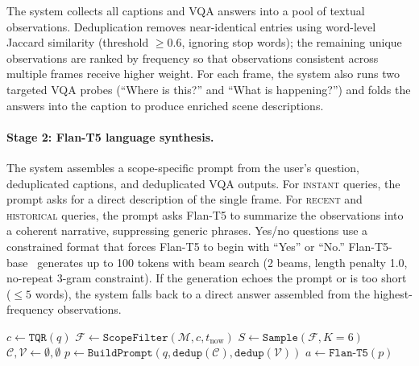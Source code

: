 The system collects all captions and VQA answers into a pool of textual observations.
Deduplication removes near-identical entries using word-level Jaccard similarity (threshold $\ge 0.6$, ignoring stop words); the remaining unique observations are ranked by frequency so that observations consistent across multiple frames receive higher weight.
For each frame, the system also runs two targeted VQA probes (``Where is this?'' and ``What is happening?'') and folds the answers into the caption to produce enriched scene descriptions.

\paragraph{Stage 2: Flan-T5 language synthesis.}
The system assembles a scope-specific prompt from the user's question, deduplicated captions, and deduplicated VQA outputs.
For \textsc{instant} queries, the prompt asks for a direct description of the single frame.
For \textsc{recent} and \textsc{historical} queries, the prompt asks Flan-T5 to summarize the observations into a coherent narrative, suppressing generic phrases.
Yes/no questions use a constrained format that forces Flan-T5 to begin with ``Yes'' or ``No.''
Flan-T5-base~\cite{chung2022flanT5} generates up to 100 tokens with beam search (2 beams, length penalty 1.0, no-repeat 3-gram constraint).
If the generation echoes the prompt or is too short ($\le 5$ words), the system falls back to a direct answer assembled from the highest-frequency observations.

\begin{algorithm}[t]
\SetAlgoLined
{}
$c \leftarrow \texttt{TQR}(q)$ 
$\mathcal{F} \leftarrow \texttt{ScopeFilter}(\mathcal{M}, c, t_{\text{now}})$\;
$S \leftarrow \texttt{Sample}(\mathcal{F}, K\!=\!6)$\;
$\mathcal{C}, \mathcal{V} \leftarrow \emptyset, \emptyset$\;
$p \leftarrow \texttt{BuildPrompt}(q, \texttt{dedup}(\mathcal{C}), \texttt{dedup}(\mathcal{V}))$\;
$a \leftarrow \texttt{Flan-T5}(p)$\;
\caption{Stream-Fused Generator}
\label{alg:sfg}
\end{algorithm}

